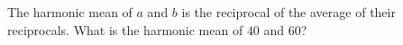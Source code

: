 The harmonic mean of $a$ and $b$ is the reciprocal of the average of their reciprocals. What is the harmonic mean of $40$ and $60$?
